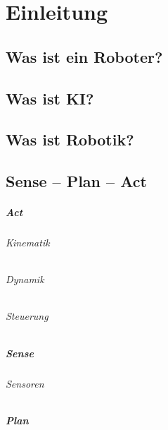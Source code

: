 \chapter{Einleitung} %
	
	\section{Was ist ein Roboter?} %

	\section{Was ist KI?} %

	\section{Was ist Robotik?} %

	\section{Sense -- Plan -- Act} %

		\paragraph{Act} %

			\subparagraph{Kinematik} %

			\subparagraph{Dynamik} %

			\subparagraph{Steuerung} %

		\paragraph{Sense} %

			\subparagraph{Sensoren} %

		\paragraph{Plan} %

